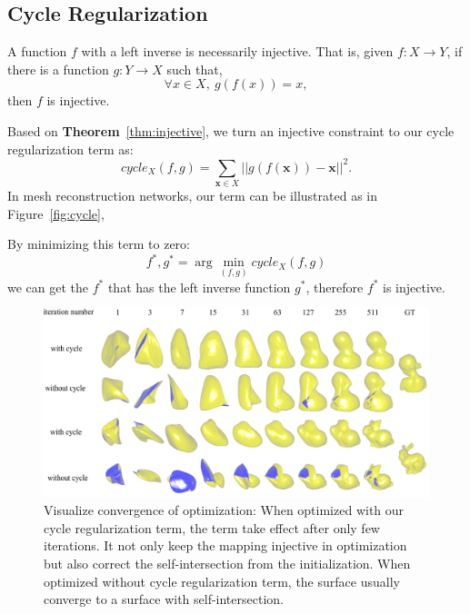 \subsection{Cycle Regularization}
\label{subsec:cyclereg}
\begin{m_thm}
\label{thm:injective}
A function $f$ with a left inverse is necessarily injective. That is, given $f:X \rightarrow Y$, if there is a function $g:Y \rightarrow X$ such that,
\begin{equation}
\label{equ:injective}
\forall x \in X,~g(f(x)) = x,
\end{equation}
then $f$ is injective.
\end{m_thm}

Based on \textbf{Theorem}~\ref{thm:injective}, we turn an injective constraint to our cycle regularization term as:
\begin{equation}
\label{equ:cycle_term}
cycle_X(f,g)=\sum_{\mathbf{x}\in X}||g(f(\mathbf{x})) - \mathbf{x}||^2.
\end{equation}
In mesh reconstruction networks, our term can be illustrated as in Figure~\ref{fig:cycle},

By minimizing this term to zero:
\begin{equation}
f^*,g^* = \arg\min_{(f,g)} cycle_X(f,g)
\end{equation}
we can get the $f^*$ that has the left inverse function $g^*$, therefore $f^*$ is injective. 

\begin{figure}[t]
	\centering
	\includegraphics[width=\linewidth]{img/opt/opt}
	\caption{Visualize convergence of optimization: When optimized with our cycle regularization term, the term take effect after only few iterations. It not only keep the mapping injective in optimization but also correct the self-intersection from the initialization. When optimized without cycle regularization term, the surface usually converge to a surface with self-intersection.}
	\label{fig:opt}
\end{figure}

